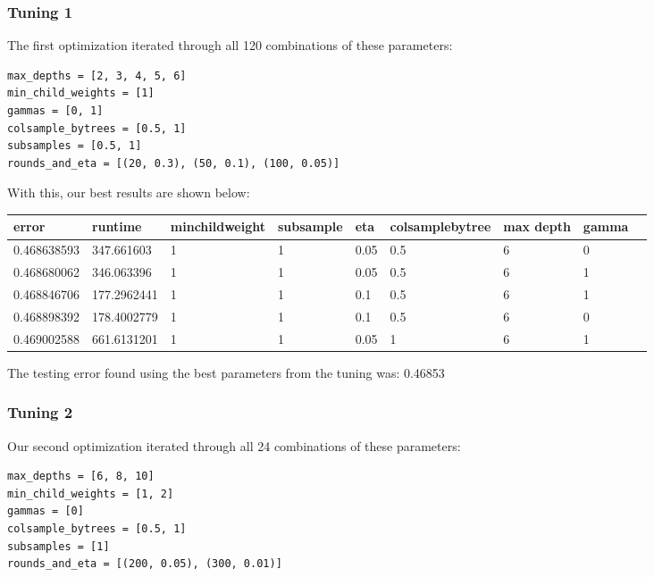 \documentclass[twoside,11pt]{article}
\theoremstyle{definition}
\begin{document}
    \subsubsection{Tuning 1}
      The first optimization iterated through all 120 combinations of these parameters:

      \begin{lstlisting}
max_depths = [2, 3, 4, 5, 6]
min_child_weights = [1]
gammas = [0, 1]
colsample_bytrees = [0.5, 1]
subsamples = [0.5, 1]
rounds_and_eta = [(20, 0.3), (50, 0.1), (100, 0.05)]
      \end{lstlisting}

      With this, our best results are shown below:

      \begin{center}
          \begin{tabular}{ | l | l | l | l | l | l | l | l | p{5cm} |}
          \hline
          error & runtime & minchildweight & subsample & eta & colsamplebytree & max depth & gamma \\ \hline
          0.468638593 & 347.661603 & 1 & 1 & 0.05 & 0.5 & 6 & 0 \\ \hline
          0.468680062 & 346.063396 & 1 & 1 & 0.05 & 0.5 & 6 & 1 \\ \hline
          0.468846706 & 177.2962441 & 1 & 1 & 0.1 & 0.5 & 6 & 1 \\ \hline
          0.468898392 & 178.4002779 & 1 & 1 & 0.1 & 0.5 & 6 & 0 \\ \hline
          0.469002588 & 661.6131201 & 1 & 1 & 0.05 & 1 & 6 & 1 \\ \hline
          \end{tabular}
      \end{center}

      The testing error found using the best parameters from the tuning was: 0.46853

    \subsubsection{Tuning 2}

      Our second optimization iterated through all 24 combinations of these parameters:

      \begin{lstlisting}
max_depths = [6, 8, 10]
min_child_weights = [1, 2]
gammas = [0]
colsample_bytrees = [0.5, 1]
subsamples = [1]
rounds_and_eta = [(200, 0.05), (300, 0.01)]
      \end{lstlisting}
\end{document}
